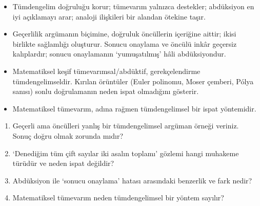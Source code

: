
\begin{itemize}[leftmargin=1.4em]
\item Tümdengelim doğruluğu korur; tümevarım yalnızca destekler; abdüksiyon en iyi açıklamayı arar; analoji ilişkileri bir alandan ötekine taşır.
\item Geçerlilik argümanın biçimine, doğruluk öncüllerin içeriğine aittir; ikisi birlikte sağlamlığı oluşturur. Sonucu onaylama ve öncülü inkâr geçersiz kalıplardır; sonucu onaylamanın ‘yumuşatılmış’ hâli abdüksiyondur.
\item Matematiksel keşif tümevarımsal/abdüktif, gerekçelendirme tümdengelimseldir. Kırılan örüntüler (Euler polinomu, Moser çemberi, Pólya sanısı) sonlu doğrulamanın neden ispat olmadığını gösterir.
\item Matematiksel tümevarım, adına rağmen tümdengelimsel bir ispat yöntemidir.
\end{itemize}


\begin{enumerate}[leftmargin=1.8em,label=\textbf{\arabic*.}]
\item Geçerli ama öncülleri yanlış bir tümdengelimsel argüman örneği veriniz. Sonuç doğru olmak zorunda mıdır?
\item ‘Denediğim tüm çift sayılar iki asalın toplamı’ gözlemi hangi muhakeme türüdür ve neden ispat değildir?
\item Abdüksiyon ile ‘sonucu onaylama’ hatası arasındaki benzerlik ve fark nedir?
\item Matematiksel tümevarım neden tümdengelimsel bir yöntem sayılır?
\end{enumerate}


